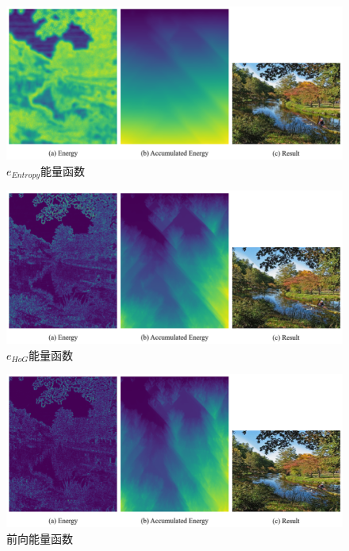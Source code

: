 \documentclass[twoside,a4paper,4pt]{article}
\begin{document}
\begin{figure}[H]
    \centering
    \includegraphics[width=\linewidth]{demo/output/charles_entropy.png}
    \vspace{-30pt}\caption{$e_{Entropy}$能量函数}
    \label{fig:charles_ent}
\end{figure}\par

\begin{figure}[H]
    \centering
    \includegraphics[width=\linewidth]{demo/output/charles_hog.png}
    \vspace{-30pt}\caption{$e_{HoG}$能量函数}
    \label{fig:charles_hog}
\end{figure}\par

\begin{figure}[H]
    \centering
    \includegraphics[width=\linewidth]{demo/output/charles_forward.png}
    \vspace{-30pt}\caption{前向能量函数}
    \label{fig:charles_efw}
\end{figure}
\end{document}
